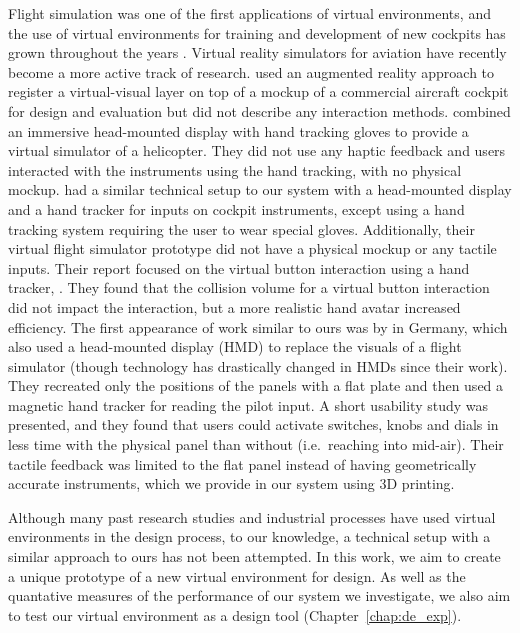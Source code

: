 Flight simulation was one of the first applications of virtual environments, and the use of virtual environments for training and development of new cockpits has grown throughout the years \citep{hancock_human_2008}.
Virtual reality simulators for aviation have recently become a more active track of research.
\citet{wan_mrstudio:_2011} used an augmented reality approach to register a virtual-visual layer on top of a mockup of a commercial aircraft cockpit for design and evaluation but did not describe any interaction methods.
\citet{yavrucuk_low_2011} combined an immersive head-mounted display with hand tracking gloves to provide a virtual simulator of a helicopter.
They did not use any haptic feedback and users interacted with the instruments using the hand tracking, with no physical mockup.
\citet{aslandere_virtual_2015} had a similar technical setup to our system with a head-mounted display and a hand tracker for inputs on cockpit instruments, except using a hand tracking system requiring the user to wear special gloves.
Additionally, their virtual flight simulator prototype did not have a physical mockup or any tactile inputs.
Their report focused on the virtual button interaction using a hand tracker, .
They found that the collision volume for a virtual button interaction did not impact the interaction, but a more realistic hand avatar increased efficiency.
The first appearance of work similar to ours was by \citet{schiefele_simple_1998} in Germany, which also used a head-mounted display (HMD) to replace the visuals of a flight simulator (though technology has drastically changed in HMDs since their work).
They recreated only the positions of the panels with a flat plate and then used a magnetic hand tracker for reading the pilot input.
A short usability study was presented, and they found that users could activate switches, knobs and dials in less time with the physical panel than without (i.e.\ reaching into mid-air).
Their tactile feedback was limited to the flat panel instead of having geometrically accurate instruments, which we provide in our system using 3D printing.

Although many past research studies and industrial processes have used virtual environments in the design process, to our knowledge, a technical setup with a similar approach to ours has not been attempted.
In this work, we aim to create a unique prototype of a new virtual environment for design.
As well as the quantative measures of the performance of our system we investigate, we also aim to test our virtual environment as a design tool (Chapter~\ref{chap:de_exp}).

